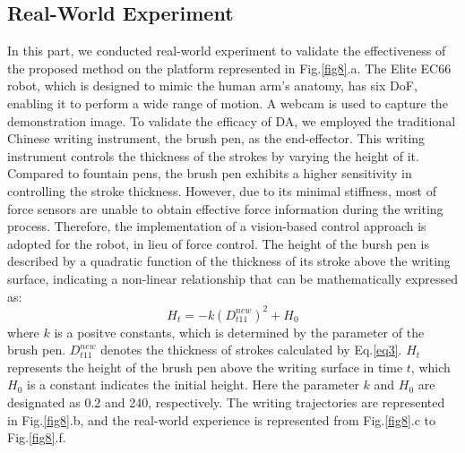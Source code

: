 \documentclass[conference]{IEEEtran}
\begin{document}
\subsection{Real-World Experiment}
In this part, we conducted real-world experiment to validate the effectiveness of the proposed method on the platform represented in Fig.\ref{fig8}.a. The Elite EC66 robot, which is designed to mimic the human arm's anatomy, has six DoF, enabling it to perform a wide range of motion. A webcam is used to capture the demonstration image. To validate the efficacy of DA, we employed the traditional Chinese writing instrument, the brush pen, as the end-effector. This writing instrument controls the thickness of the strokes by varying the height of it. Compared to fountain pens, the brush pen exhibits a higher sensitivity in controlling the stroke thickness. However, due to its minimal stiffness, most of force sensors are unable to obtain effective force information during the writing process. Therefore, the implementation of a vision-based control approach is adopted for the robot, in lieu of force control. The height of the bursh pen is described by a quadratic function of the thickness of its stroke above the writing surface\cite{Guo2022}, indicating a non-linear relationship that can be mathematically expressed as:
\begin{equation}
    H_t=-k(D_{t11}^{new})^2+H_0
\end{equation}
where $k$ is a positve constants, which is determined by the parameter of the brush pen. $D_{t11}^{new}$ denotes the thickness of strokes calculated by Eq.\ref{eq3}. $H_t$ represents the height of the brush pen above the writing surface in time $t$, which $H_0$ is a constant indicates the initial height. Here the parameter $k$ and $H_0$ are designated as 0.2 and 240, respectively. The writing trajectories are represented in Fig.\ref{fig8}.b, and the real-world experience is represented from Fig.\ref{fig8}.c to Fig.\ref{fig8}.f.
\end{document}
